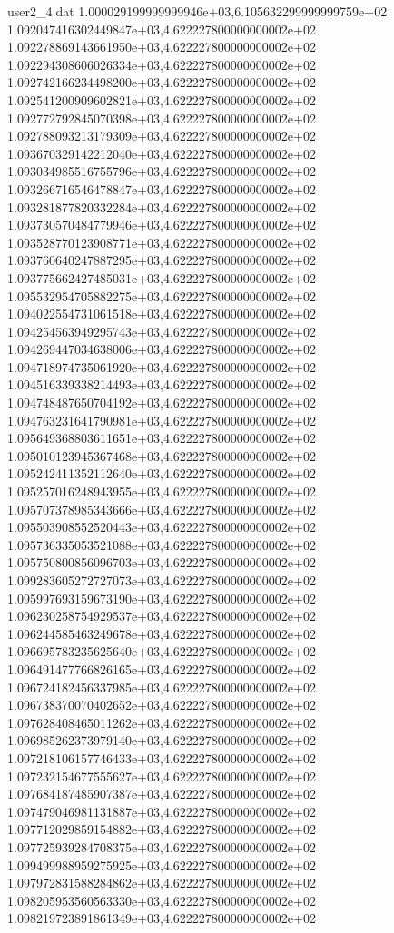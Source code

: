 \begin{filecontents}{user2_4.dat}
1.000029199999999946e+03,6.105632299999999759e+02
1.092047416302449847e+03,4.622227800000000002e+02
1.092278869143661950e+03,4.622227800000000002e+02
1.092294308606026334e+03,4.622227800000000002e+02
1.092742166234498200e+03,4.622227800000000002e+02
1.092541200909602821e+03,4.622227800000000002e+02
1.092772792845070398e+03,4.622227800000000002e+02
1.092788093213179309e+03,4.622227800000000002e+02
1.093670329142212040e+03,4.622227800000000002e+02
1.093034985516755796e+03,4.622227800000000002e+02
1.093266716546478847e+03,4.622227800000000002e+02
1.093281877820332284e+03,4.622227800000000002e+02
1.093730570484779946e+03,4.622227800000000002e+02
1.093528770123908771e+03,4.622227800000000002e+02
1.093760640247887295e+03,4.622227800000000002e+02
1.093775662427485031e+03,4.622227800000000002e+02
1.095532954705882275e+03,4.622227800000000002e+02
1.094022554731061518e+03,4.622227800000000002e+02
1.094254563949295743e+03,4.622227800000000002e+02
1.094269447034638006e+03,4.622227800000000002e+02
1.094718974735061920e+03,4.622227800000000002e+02
1.094516339338214493e+03,4.622227800000000002e+02
1.094748487650704192e+03,4.622227800000000002e+02
1.094763231641790981e+03,4.622227800000000002e+02
1.095649368803611651e+03,4.622227800000000002e+02
1.095010123945367468e+03,4.622227800000000002e+02
1.095242411352112640e+03,4.622227800000000002e+02
1.095257016248943955e+03,4.622227800000000002e+02
1.095707378985343666e+03,4.622227800000000002e+02
1.095503908552520443e+03,4.622227800000000002e+02
1.095736335053521088e+03,4.622227800000000002e+02
1.095750800856096703e+03,4.622227800000000002e+02
1.099283605272727073e+03,4.622227800000000002e+02
1.095997693159673190e+03,4.622227800000000002e+02
1.096230258754929537e+03,4.622227800000000002e+02
1.096244585463249678e+03,4.622227800000000002e+02
1.096695783235625640e+03,4.622227800000000002e+02
1.096491477766826165e+03,4.622227800000000002e+02
1.096724182456337985e+03,4.622227800000000002e+02
1.096738370070402652e+03,4.622227800000000002e+02
1.097628408465011262e+03,4.622227800000000002e+02
1.096985262373979140e+03,4.622227800000000002e+02
1.097218106157746433e+03,4.622227800000000002e+02
1.097232154677555627e+03,4.622227800000000002e+02
1.097684187485907387e+03,4.622227800000000002e+02
1.097479046981131887e+03,4.622227800000000002e+02
1.097712029859154882e+03,4.622227800000000002e+02
1.097725939284708375e+03,4.622227800000000002e+02
1.099499988959275925e+03,4.622227800000000002e+02
1.097972831588284862e+03,4.622227800000000002e+02
1.098205953560563330e+03,4.622227800000000002e+02
1.098219723891861349e+03,4.622227800000000002e+02

\end{filecontents}
